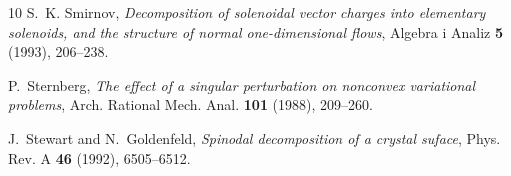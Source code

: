 \documentclass[a4paper]{article}
\theoremstyle{definition}
\theoremstyle{remark}
\begin{document}
\begin{thebibliography}{10}
S.~K. Smirnov, \emph{Decomposition of solenoidal vector charges into elementary
  solenoids, and the structure of normal one-dimensional flows}, Algebra i
  Analiz \textbf{5} (1993), 206--238.

P.~Sternberg, \emph{The effect of a singular perturbation on nonconvex
  variational problems}, Arch. Rational Mech. Anal. \textbf{101} (1988),
  209--260.

J.~Stewart and N.~Goldenfeld, \emph{Spinodal decomposition of a crystal
  suface}, Phys. Rev. A \textbf{46} (1992), 6505--6512.

\end{thebibliography}
\end{document}
